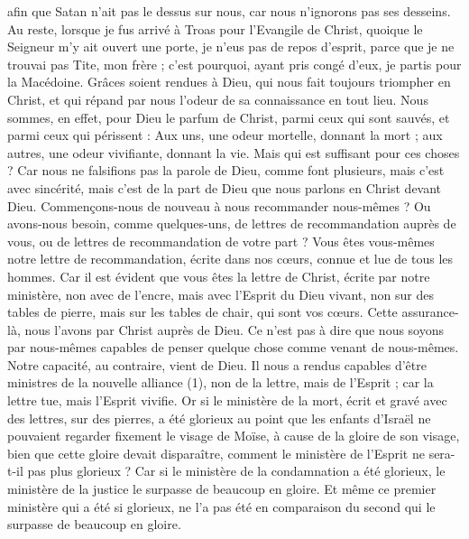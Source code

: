 \begin{multicols}{2}
afin que Satan n'ait pas le dessus sur nous, car nous n'ignorons pas ses desseins.
Au reste, lorsque je fus arrivé à Troas pour l'Evangile de Christ, quoique le Seigneur m’y ait ouvert une porte, je n’eus pas de repos d’esprit, parce que je ne trouvai pas Tite, mon frère ;
c’est pourquoi, ayant pris congé d'eux, je partis pour la Macédoine.
Grâces soient rendues à Dieu, qui nous fait toujours triompher en Christ, et qui répand par nous l'odeur de sa connaissance en tout lieu.
Nous sommes, en effet, pour Dieu le parfum de Christ, parmi ceux qui sont sauvés, et parmi ceux qui périssent :
Aux uns, une odeur mortelle, donnant la mort ; aux autres, une odeur vivifiante, donnant la vie. Mais qui est suffisant pour ces choses ?
Car nous ne falsifions pas la parole de Dieu, comme font plusieurs, mais c’est avec sincérité, mais c’est de la part de Dieu que nous parlons en Christ devant Dieu.
\VerseOne{}Commençons-nous de nouveau à nous recommander nous-mêmes ? Ou avons-nous besoin, comme quelques-uns, de lettres de recommandation auprès de vous, ou de lettres de recommandation de votre part ?
Vous êtes vous-mêmes notre lettre de recommandation, écrite dans nos cœurs, connue et lue de tous les hommes.
Car il est évident que vous êtes la lettre de Christ, écrite par notre ministère, non avec de l'encre, mais avec l'Esprit du Dieu vivant, non sur des tables de pierre, mais sur les tables de chair, qui sont vos cœurs.
Cette assurance-là, nous l’avons par Christ auprès de Dieu.
Ce n’est pas à dire que nous soyons par nous-mêmes capables de penser quelque chose comme venant de nous-mêmes. Notre capacité, au contraire, vient de Dieu.
Il nous a rendus capables d'être ministres de la nouvelle alliance (1), non de la lettre, mais de l'Esprit ; car la lettre tue, mais l'Esprit vivifie.
Or si le ministère de la mort, écrit et gravé avec des lettres, sur des pierres, a été glorieux au point que les enfants d'Israël ne pouvaient regarder fixement le visage de Moïse, à cause de la gloire de son visage, bien que cette gloire devait disparaître,
comment le ministère de l'Esprit ne sera-t-il pas plus glorieux ?
Car si le ministère de la condamnation a été glorieux, le ministère de la justice le surpasse de beaucoup en gloire.
Et même ce premier ministère qui a été si glorieux, ne l'a pas été en comparaison du second qui le surpasse de beaucoup en gloire.

\end{multicols}
